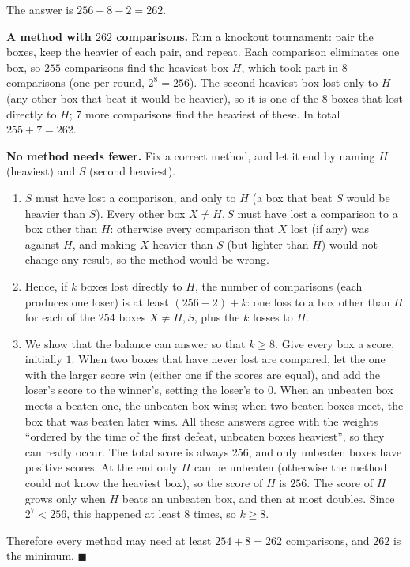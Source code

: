 The answer is $256+8-2=\boxed{262}$.

\textbf{A method with $262$ comparisons.} Run a knockout tournament: pair the boxes, keep the heavier of each pair, and repeat. Each comparison eliminates one box, so $255$ comparisons find the heaviest box $H$, which took part in $8$ comparisons (one per round, $2^8=256$). The second heaviest box lost only to $H$ (any other box that beat it would be heavier), so it is one of the $8$ boxes that lost directly to $H$; $7$ more comparisons find the heaviest of these. In total $255+7=262$.

\textbf{No method needs fewer.} Fix a correct method, and let it end by naming $H$ (heaviest) and $S$ (second heaviest).
\begin{enumerate}
\item[(i)] $S$ must have lost a comparison, and only to $H$ (a box that beat $S$ would be heavier than $S$). Every other box $X\ne H,S$ must have lost a comparison to a box other than $H$: otherwise every comparison that $X$ lost (if any) was against $H$, and making $X$ heavier than $S$ (but lighter than $H$) would not change any result, so the method would be wrong.
\item[(ii)] Hence, if $k$ boxes lost directly to $H$, the number of comparisons (each produces one loser) is at least $(256-2)+k$: one loss to a box other than $H$ for each of the $254$ boxes $X\ne H,S$, plus the $k$ losses to $H$.
\item[(iii)] We show that the balance can answer so that $k\ge8$. Give every box a score, initially $1$. When two boxes that have never lost are compared, let the one with the larger score win (either one if the scores are equal), and add the loser's score to the winner's, setting the loser's to $0$. When an unbeaten box meets a beaten one, the unbeaten box wins; when two beaten boxes meet, the box that was beaten later wins. All these answers agree with the weights ``ordered by the time of the first defeat, unbeaten boxes heaviest'', so they can really occur. The total score is always $256$, and only unbeaten boxes have positive scores. At the end only $H$ can be unbeaten (otherwise the method could not know the heaviest box), so the score of $H$ is $256$. The score of $H$ grows only when $H$ beats an unbeaten box, and then at most doubles. Since $2^7<256$, this happened at least $8$ times, so $k\ge8$.
\end{enumerate}
Therefore every method may need at least $254+8=262$ comparisons, and $262$ is the minimum. $\blacksquare$
